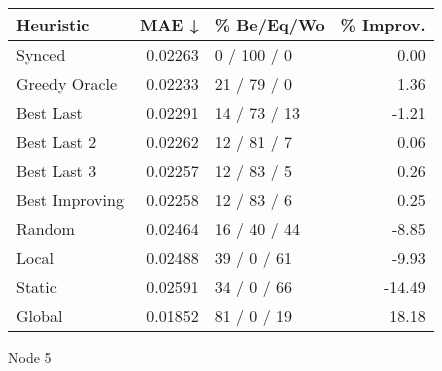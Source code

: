 \begin{tabular}{lrlr}
\toprule
\textbf{Heuristic} & \textbf{MAE ↓} & \textbf{\% Be/Eq/Wo} & \textbf{\% Improv.} \\
\midrule
            Synced &        0.02263 &          0 / 100 / 0 &                0.00 \\
     Greedy Oracle &        0.02233 &          21 / 79 / 0 &                1.36 \\
         Best Last &        0.02291 &         14 / 73 / 13 &               -1.21 \\
       Best Last 2 &        0.02262 &          12 / 81 / 7 &                0.06 \\
       Best Last 3 &        0.02257 &          12 / 83 / 5 &                0.26 \\
    Best Improving &        0.02258 &          12 / 83 / 6 &                0.25 \\
            Random &        0.02464 &         16 / 40 / 44 &               -8.85 \\
             Local &        0.02488 &          39 / 0 / 61 &               -9.93 \\
            Static &        0.02591 &          34 / 0 / 66 &              -14.49 \\
            Global &        0.01852 &          81 / 0 / 19 &               18.18 \\
\bottomrule
\end{tabular}
\caption{Node 5}
\label{tab:iid_lr05_le1_bs2_5}
